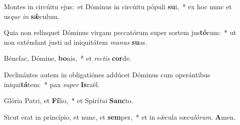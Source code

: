 Montes in circúitu ejus:~\reddagger et Dóminus in circúitu pópuli \textbf{su}i,~* ex hoc nunc et us\textit{que} \textit{in} \textbf{sǽ}culum.

Quia non relínquet Dóminus virgam peccatórum super sortem jus\textbf{tó}rum:~* ut non exténdant justi ad iniquitátem \textit{ma}\textit{nus} \textbf{su}as.

Bénefac, Dómine, \textbf{bo}nis,~* et \textit{rec}\textit{tis} \textbf{cor}de.

Declinántes autem in obligatiónes addúcet Dóminus cum operántibus iniqui\textbf{tá}tem:~* pax \textit{su}\textit{per} \textbf{Is}raël.

Glória Patri, et \textbf{Fí}lio,~* et Spirí\textit{tu}\textit{i} \textbf{Sanc}to.

Sicut erat in princípio, et nunc, et \textbf{sem}per,~* et in sǽcula sæcu\textit{ló}\textit{rum}. \textbf{A}men.

